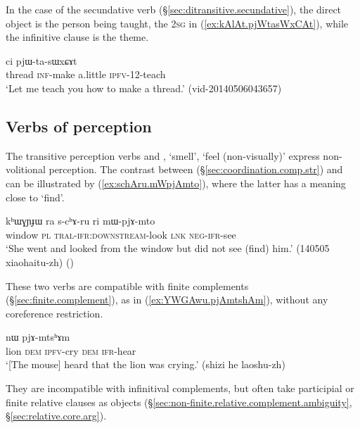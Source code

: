 In the case of the secundative verb  (§\ref{sec:ditransitive.secundative}), the direct object is the person being taught, the \textsc{2sg} in (\ref{ex:kAlAt.pjWtasWxCAt}), while the infinitive clause is the theme.

\begin{exe}
\ex \label{ex:kAlAt.pjWtasWxCAt}
  ci pjɯ-ta-sɯxɕɤt \\
 thread \textsc{inf}-make a.little \textsc{ipfv}-1\fl{}2-teach \\
 \glt `Let me teach you how to make a thread.' (vid-20140506043657)
  \end{exe}
  
 \subsection{Verbs of perception}   \label{sec:mto.mtshAm.complement}
The transitive perception verbs  and , `smell', `feel (non-visually)' express non-volitional perception. The contrast between  (§\ref{sec:coordination.comp.str}) and  can be illustrated by (\ref{ex:schAru.mWpjAmto}), where the latter has a meaning close to `find'.

\begin{exe}
\ex \label{ex:schAru.mWpjAmto}
 \gll kʰɯɣɲɟɯ ra s-cʰɤ-ru ri mɯ-pjɤ-mto \\
 window \textsc{pl} \textsc{tral}-\textsc{ifr}:\textsc{downstream}-look \textsc{lnk} \textsc{neg}-\textsc{ifr}-see \\
 \glt `She went and looked from the window but did not see (find) him.' (140505 xiaohaitu-zh)
()
\end{exe}

These two verbs are compatible with finite complements (§\ref{sec:finite.complement}), as in (\ref{ex:YWGAwu.pjAmtshAm}), without any coreference restriction. 

\begin{exe}
\ex \label{ex:YWGAwu.pjAmtshAm}
  nɯ pjɤ-mtsʰɤm \\
 lion \textsc{dem} \textsc{ipfv}-cry \textsc{dem} \textsc{ifr}-hear \\
 \glt `[The mouse] heard that the lion was crying.' (shizi he laoshu-zh)
\end{exe}

They are incompatible with infinitival complements, but often take participial or finite relative clauses as objects (§\ref{sec:non-finite.relative.complement.ambiguity}, §\ref{sec:relative.core.arg}). 

